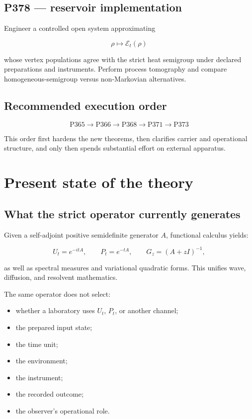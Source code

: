 \documentclass[11pt,a4paper,openany]{report}
\begin{document}
\section{P378 --- reservoir implementation}

Engineer a controlled open system approximating

\[
\rho\mapsto\mathcal E_t(\rho)
\]

whose vertex populations agree with the strict heat semigroup under declared preparations and instruments. Perform process tomography and compare homogeneous-semigroup versus non-Markovian alternatives.

\section{Recommended execution order}

\[
\boxed{
\mathrm{P365}
\rightarrow
\mathrm{P366}
\rightarrow
\mathrm{P368}
\rightarrow
\mathrm{P371}
\rightarrow
\mathrm{P373}
}
\]

This order first hardens the new theorems, then clarifies carrier and operational structure, and only then spends substantial effort on external apparatus.

\chapter{Present state of the theory}

\section{What the strict operator currently generates}

Given a self-adjoint positive semidefinite generator \(A\), functional calculus yields:

\[
U_t=e^{-itA},
\qquad
P_t=e^{-tA},
\qquad
G_z=(A+zI)^{-1},
\]

as well as spectral measures and variational quadratic forms. This unifies wave, diffusion, and resolvent mathematics.

The same operator does not select:

\begin{itemize}
\item 
whether a laboratory uses \(U_t\), \(P_t\), or another channel;

\item 
the prepared input state;

\item 
the time unit;

\item 
the environment;

\item 
the instrument;

\item 
the recorded outcome;

\item 
the observer's operational role.

\end{itemize}
\end{document}
